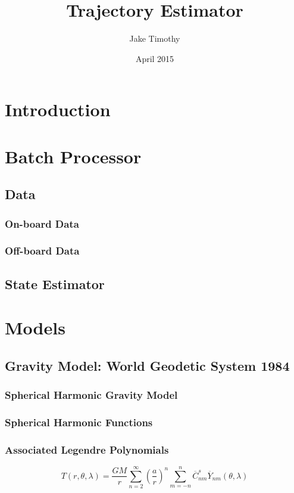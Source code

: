\documentclass{article}
\title{Trajectory Estimator}
\author{Jake Timothy}
\date{April 2015}
\begin{document}
\maketitle

\section{Introduction}

\section{Batch Processor}
\subsection{Data}
\subsubsection{On-board Data}
\subsubsection{Off-board Data}

\subsection{State Estimator}

\section{Models}
\subsection{Gravity Model: World Geodetic System 1984~\cite{wgs84,egm2008}}
\subsubsection{Spherical Harmonic Gravity Model}
\subsubsection{Spherical Harmonic Functions}
\subsubsection{Associated Legendre Polynomials}
\begin{equation}
T{\left(r,\theta,\lambda\right)} = \frac{G M}{r} \sum_{n=2}^\infty \left(\frac{a}{r}\right)^n \sum_{m=-n}^n \overline{C}_{n m}^s \overline{Y}_{n m}{\left(\theta,\lambda\right)}
\end{equation}
\end{document}
